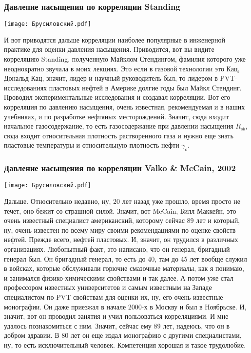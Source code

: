 \documentclass[main.tex]{subfiles}
\begin{document}
\subsubsection{Давление насыщения по корреляции Standing}

\begin{center}
\texttt{[image: Брусиловский.pdf]}
\end{center}

И вот приводятся дальше корреляции наиболее популярные в инженерной практике для оценки давления насыщения.
Приводится, вот вы видите корреляцию Standing, полученную Майклом Стендингом, фамилия которого уже неоднократно звучала в моих лекциях.
Это если в газовой технологии это Кац, Дональд Кац, значит, лидер и научный руководитель был, то лидером в PVT-исследованиях пластовых нефтей в Америке долгие годы был Майкл Стендинг.
Проводил экспериментальные исследования и создавал корреляции.
Вот его корреляция по давлению насыщения, очень известная, рекомендуемая и в наших учебниках, и по разработке нефтяных месторождений.
Значит, сюда входит начальное газосодержание, то есть газосодержание при давлении насыщения $R_{sb}$, сюда входит относительная плотность растворенного газа и нужно еще знать пластовые температуры и относительную плотность нефти $\gamma_{o}$.

\subsubsection{Давление насыщения по корреляции Valko \& McCain, 2002}

\begin{center}
\texttt{[image: Брусиловский.pdf]}
\end{center}

Дальше.
Относительно недавно, ну, 20 лет назад уже прошло, время просто не течет, оно бежит со страшной силой.
Значит, вот McCain, Билл Маккейн, это очень известный специалист американский, которому сейчас 89 лет и который, ну, очень известен по всему миру своими рекомендациями по оценке свойств нефтей.
Прежде всего, нефтей пластовых.
И, значит, он трудился в различных организациях.
Любопытный факт, это написано, что он генерал, бригадный генерал был.
Он бригадный генерал, то есть до 40, там до 45 лет вообще служил в войсках, которые обслуживали горючие смазочные материалы, как я понимаю, и занимался физико-химическими свойствами и так далее.
А потом уже стал профессором известных университетов и самым известным на Западе специалистом по PVT-свойствам для оценки их, ну, его очень известные монографии.
Он даже приезжал в начале 2000-х в Москву и был в Ноябрьске.
И, значит, вот он проводил занятия и учил пользоваться корреляциями.
И мне удалось познакомиться с ним.
Значит, сейчас ему 89 лет, надеюсь, что он в добром здравии.
В 80 лет он еще издал монографию с другими специалистами, ну, то есть исключительный человек.
Компетенция хорошая и такое трудолюбие.
\end{document}
